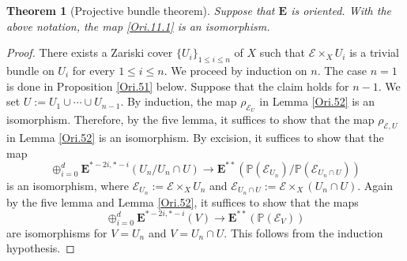 \documentclass[11pt, a4paper]{amsart}
\newtheorem{thm}{Theorem}[subsection]
\theoremstyle{definition}
\numberwithin{equation}{subsection}
\renewcommand{\P}{\mathbb{P}}
\newcommand{\cE}{\mathcal{E}}
\newcommand{\ringE}{\mathbf{E}}
\begin{document}
\begin{thm}
[Projective bundle theorem]
\label{Ori.11}
Suppose that $\ringE$ is oriented.
With the above notation, the map \eqref{Ori.11.1} is an isomorphism.
\end{thm}
\begin{proof}
There exists a Zariski cover $\{U_i\}_{1\leq i\leq n}$ of $X$ such that $\cE\times_X U_i$ is a trivial bundle on $U_i$ for every $1\leq i\leq n$.
We proceed by induction on $n$.
The case $n=1$ is done in Proposition \ref{Ori.51} below.
Suppose that the claim holds for $n-1$.
We set $U:=U_1\cup \cdots \cup U_{n-1}$.
By induction, the map $\rho_{\cE_U}$ in Lemma \ref{Ori.52} is an isomorphism.
Therefore, by the five lemma, it suffices to show that the map $\rho_{\cE,U}$ in 
Lemma \ref{Ori.52} is an isomorphism.
By excision, it suffices to show that the map
\[
\oplus_{i=0}^d \ringE^{*-2i,*-i}(U_n/U_n\cap U)
\to
\ringE^{**}(\P(\cE_{U_n})/\P(\cE_{U_n\cap U}))
\]
is an isomorphism, where $\cE_{U_n}:=\cE\times_X U_n$ and $\cE_{U_n\cap U}:=\cE\times_X (U_n\cap U)$.
Again by the five lemma and Lemma \ref{Ori.52}, it suffices to show that the maps
\[
\oplus_{i=0}^d \ringE^{*-2i,*-i}(V)
\to
\ringE^{**}(\P(\cE_V))
\]
are isomorphisms for $V=U_n$ and $V=U_n\cap U$.
This follows from the induction hypothesis.
\end{proof}
\end{document}
